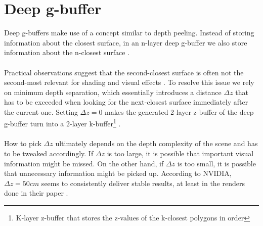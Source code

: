 \documentclass{ACGSeminar}
\begin{document}
\section{Deep g-buffer}
	Deep g-buffers make use of a concept similar to depth peeling. Instead of storing information about the closest surface, in an n-layer deep g-buffer we also store information about the n-closest surface \cite{Mara2016DeepGBuffer}. \\\\
	Practical observations suggest that the second-closest surface is often not the second-most relevant for shading and visual effects \cite{Mara2016DeepGBuffer}. To resolve this issue we rely on minimum depth separation, which essentially introduces a distance $\Delta z$ that has to be exceeded when looking for the next-closest surface immediately after the current one. Setting $\Delta z = 0$ makes the generated 2-layer z-buffer of the deep g-buffer turn into a 2-layer k-buffer\footnote{K-layer z-buffer that stores the z-values of the k-closest polygons in order} \cite{MFEKB}. \\\\
	How to pick $\Delta z$ ultimately depends on the depth complexity of the scene and has to be tweaked accordingly. If $\Delta z$ is too large, it is possible that important visual information might be missed. On the other hand, if $\Delta z$ is too small, it is possible that unnecessary information might be picked up. According to NVIDIA, $\Delta z = 50cm$ seems to consistently deliver stable results, at least in the renders done in their paper \cite{Mara2016DeepGBuffer}.
\end{document}
